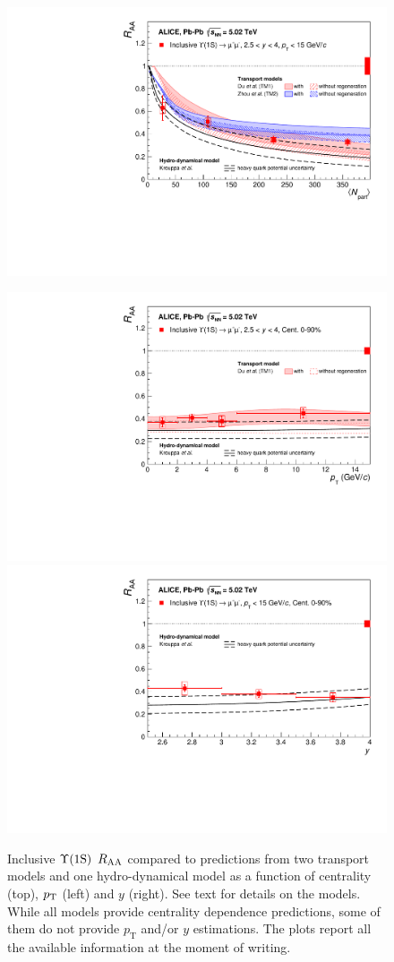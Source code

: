 \begin{figure}[!t]
\begin{center}
\includegraphics[width=0.5\linewidth]{Chapters/Analysis/Figs/RAA_Cent_ALICE2015_Rapp_Zhou_Strickland_style3.pdf} \\
\end{center}
\includegraphics[width=0.5\linewidth]{Chapters/Analysis/Figs/RAA_Pt_ALICE2015_Rapp_Strickland_style3.pdf}
\includegraphics[width=0.5\linewidth]{Chapters/Analysis/Figs/RAA_Y_ALICE2015_Strickland_style3.pdf}
\caption{Inclusive $\mbox{$\Upsilon$(1S)}$ $\mbox{$R_{\rm{AA}}$}$ compared to predictions from two transport models \cite{Du:2017qkv,Zhou:2014hwa} and one hydro-dynamical model \cite{Krouppa:2017jlg} as a function of centrality (top), $\mbox{$p_{\rm T}$}$ (left) and $y$ (right). See text for details on the models. While all models provide centrality dependence predictions, some of them do not provide $p_{\mathrm{T}}$ and/or $y$ estimations. The plots report all the available information at the moment of writing.}
\label{fig:raa_models}
\end{figure}

